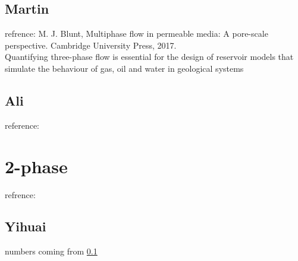 \documentclass{article}
\begin{document}
\subsection{Martin}\label{martin}
refrence: M. J. Blunt, Multiphase flow in permeable media: A pore-scale perspective. Cambridge University Press, 2017.\\
Quantifying three-phase flow is essential for the design of reservoir models that simulate the behaviour of gas, oil and water in geological systems

\subsection{Ali}
reference: \\

\section{2-phase}
refrence: \\

\subsection{Yihuai}
numbers coming from \ref{martin}
\end{document}
